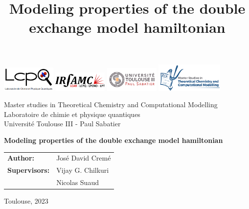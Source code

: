 \documentclass[12pt,twoside]{report}
\title{Modeling properties of the double exchange model hamiltonian}
\begin{document}
	\begin{titlepage}
		\begin{center}
			\includegraphics[width = 0.2\textwidth]{lcpq.png} \hspace{0.5cm}
			\includegraphics[width = 0.2\textwidth]{irsamac.png} \hspace{0.5cm}
			\includegraphics[width = 0.2\textwidth]{ups.png} \hspace{0.5cm}
			\includegraphics[width = 0.25\textwidth]{TCCM.png} \\
			\vspace{1cm}
			\Large
			{Master studies in Theoretical Chemistry and Computational Modelling\\
				Laboratoire de chimie et physique quantiques\\
				Université Toulouse III - Paul Sabatier\\
				
				
				\vspace{-0.5cm}
				
				
				
				
				
				
				\vspace{2cm}
				\Huge
				\textbf{ \color{MSUgreen} Modeling properties of the double exchange model hamiltonian }
				
				\vspace{3cm}
				\Large
				\begin{tabular}{l l}			
					{\bf Author:}   & Jos\'e David Crem\'e \\[1cm]
					{\bf Supervisors:} & Vijay G. Chilkuri \\
					& Nicolas Suaud
				\end{tabular}
			}
			
			\vspace{3cm}
			\Large
			Toulouse, 2023 \\
			
			\vspace{0.8cm}
			
		\end{center}
	\end{titlepage}
\end{document}
